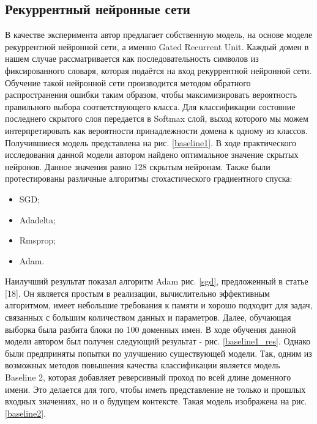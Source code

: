     \subsection{Рекуррентный нейронные сети}\label{lstm_class_exp}
    В качестве эксперимента автор предлагает собственную модель, на основе моделе рекуррентной нейронной сети, а именно Gated Recurrent Unit. Каждый домен в нашем случае рассматривается как последовательность символов из фиксированного словаря, которая подаётся на вход рекуррентной нейронной сети. Обучение такой нейронной сети производится методом обратного распространения ошибки таким образом, чтобы максимизировать вероятность правильного выбора соответствующего класса. Для классификации состояние последнего скрытого слоя передается в Softmax слой, выход которого мы можем интерпретировать как вероятности принадлежности домена к одному из классов. Получившиеся модель представлена на рис. \ref{baseline1}.
    В ходе практического исследования данной модели автором найдено оптимальное значение скрытых нейронов. Данное значения равно 128 скрытым нейронам. %
    Также были протестированы различные алгоритмы стохастического градиентного спуска:
    \begin{itemize}
    \item SGD;
    \item Adadelta;
    \item Rmsprop;
    \item Adam.
    \end{itemize}
    Наилучший результат показал алгоритм Adam рис. \ref{sgd}, предложенный в статье [18]. Он является простым в реализации, вычислительно эффективным алгоритмом, имеет небольшие требования к памяти и хорошо подходит для задач, связанных с большим количеством данных и параметров.
    Далее, обучающая выборка была разбита блоки по 100 доменных имен. В ходе обучения данной модели автором был получен следующий результат - рис. \ref{baseline1_res}.
    Однако были предприняты попытки по улучшению существующей модели. Так, одним из возможных методов повышения качества классификации является модель Baseline 2, которая добавляет реверсивный проход по всей длине доменного имени. Это делается для того, чтобы иметь представление не только и прошлых входных значениях, но и о будущем контексте. Такая модель изображена на рис. \ref{baseline2}.
